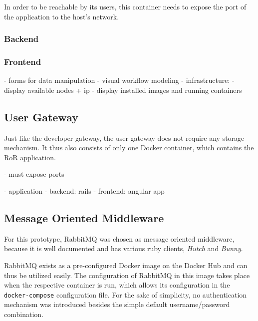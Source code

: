       In order to be reachable by its users, this container needs to expose the port of the application to the host's network.

      \subsubsection{Backend} %
      \label{ssub:backend}



      \subsubsection{Frontend} %
        \label{ssub:frontend}
          - forms for data manipulation
          - visual workflow modeling
          - infrastructure:
            - display available nodes + ip
            - display installed images and running containers


  \subsection{User Gateway} %
    \label{sub:user_gateway}
    Just like the developer gateway, the user gateway does not require any storage mechanism. It thus also consists of only one Docker container, which contains the \ac{RoR} application.

    - must expose ports

      - application
        - backend: rails
        - frontend: angular app

  \subsection{Message Oriented Middleware} %
    \label{sub:message_oriented_middleware}
      For this prototype, RabbitMQ was chosen as message oriented middleware, because it is well documented and has various ruby clients, \eg \emph{Hutch} and \emph{Bunny}.

      RabbitMQ exists as a pre-configured Docker image on the Docker Hub and can thus be utilized easily. The configuration of RabbitMQ in this image takes place when the respective container is run, which allows its configuration in the \texttt{docker-compose} configuration file.
      For the sake of simplicity, no authentication mechanism was introduced besides the simple default username/password combination.

